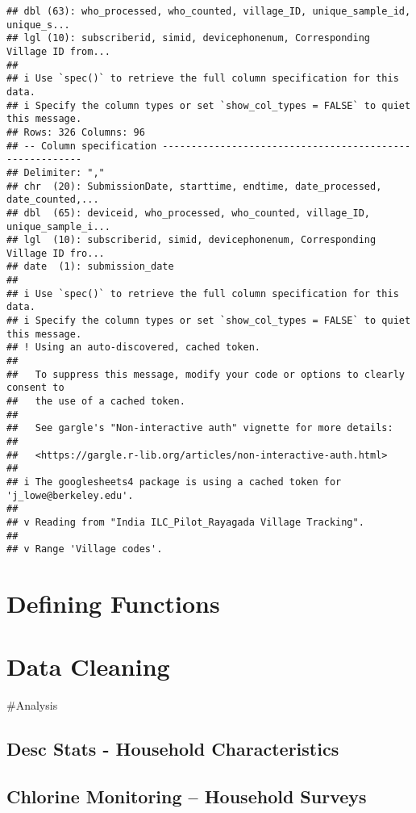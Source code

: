 \documentclass[
]{article}
\begin{document}
\begin{verbatim}
## dbl (63): who_processed, who_counted, village_ID, unique_sample_id, unique_s...
## lgl (10): subscriberid, simid, devicephonenum, Corresponding Village ID from...
## 
## i Use `spec()` to retrieve the full column specification for this data.
## i Specify the column types or set `show_col_types = FALSE` to quiet this message.
## Rows: 326 Columns: 96
## -- Column specification --------------------------------------------------------
## Delimiter: ","
## chr  (20): SubmissionDate, starttime, endtime, date_processed, date_counted,...
## dbl  (65): deviceid, who_processed, who_counted, village_ID, unique_sample_i...
## lgl  (10): subscriberid, simid, devicephonenum, Corresponding Village ID fro...
## date  (1): submission_date
## 
## i Use `spec()` to retrieve the full column specification for this data.
## i Specify the column types or set `show_col_types = FALSE` to quiet this message.
## ! Using an auto-discovered, cached token.
## 
##   To suppress this message, modify your code or options to clearly consent to
##   the use of a cached token.
## 
##   See gargle's "Non-interactive auth" vignette for more details:
## 
##   <https://gargle.r-lib.org/articles/non-interactive-auth.html>
## 
## i The googlesheets4 package is using a cached token for 'j_lowe@berkeley.edu'.
## 
## v Reading from "India ILC_Pilot_Rayagada Village Tracking".
## 
## v Range 'Village codes'.
\end{verbatim}

\hypertarget{defining-functions}{%
\section{Defining Functions}\label{defining-functions}}

\newpage

\hypertarget{data-cleaning}{%
\section{Data Cleaning}\label{data-cleaning}}

\newpage

\#Analysis

\hypertarget{desc-stats---household-characteristics}{%
\subsection{Desc Stats - Household
Characteristics}\label{desc-stats---household-characteristics}}

\hypertarget{chlorine-monitoring-household-surveys}{%
\subsection{Chlorine Monitoring -- Household
Surveys}\label{chlorine-monitoring-household-surveys}}
\end{document}
